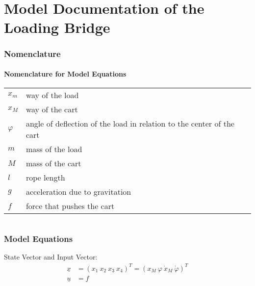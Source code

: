 \documentclass[10pt,a4paper]{article}
\begin{document}
	\part*{Model Documentation of the \\ Loading Bridge} %
	
	
	\section{Nomenclature} %
	\subsection{Nomenclature for Model Equations} %
	
	\begin{tabular}{ll}
		$x_m$ & way of the load \\
		$x_M$ & way of the cart \\
		$\varphi$ & angle of deflection of the load in relation to the center of the cart\\
		$m$ & mass of the load \\
		$M$ & mass of the cart \\
		$l$ & rope length \\
		$g$ & acceleration due to gravitation \\
		$f$ & force that pushes the cart \\
				
	\end{tabular}
	 
	
	\begin{tabular}{ll}

	\end{tabular}
	
	
	\section{Model Equations} %
	
	State Vector and Input Vector:
	\begin{align*}
		\underline{x} &= (x_1 \ x_2 \ x_3 \ x_4)^T = (x_M\ \varphi\ \dot{x}_M \ \dot{\varphi})^T\\
		\underline{u} &= f
	\end{align*}
	
\end{document}
